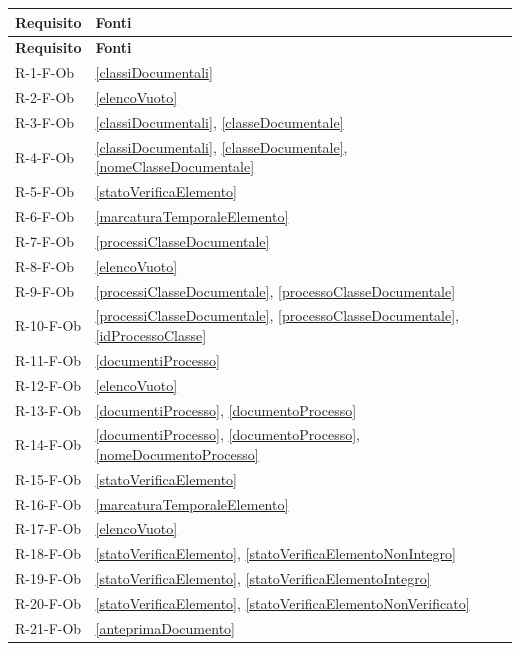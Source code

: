 \setlength{\LTleft}{\fill}
\setlength{\LTright}{\fill}
\begin{longtable}{|p{4cm}|p{10cm}|}
\hline
\rowcolor{zpusgreen!30}
\textbf{Requisito} & \textbf{Fonti} \\
\hline
\endfirsthead
\rowcolor{zpusgreen!30}
\textbf{Requisito} & \textbf{Fonti} \\
\hline
\endhead
R-1-F-Ob & \ref{classiDocumentali} \\
\hline
R-2-F-Ob & \ref{elencoVuoto} \\
\hline
R-3-F-Ob & \ref{classiDocumentali}, \ref{classeDocumentale} \\
\hline
R-4-F-Ob & \ref{classiDocumentali}, \ref{classeDocumentale}, \ref{nomeClasseDocumentale} \\
\hline
R-5-F-Ob & \ref{statoVerificaElemento} \\
\hline
R-6-F-Ob & \ref{marcaturaTemporaleElemento} \\
\hline
R-7-F-Ob & \ref{processiClasseDocumentale} \\
\hline
R-8-F-Ob & \ref{elencoVuoto} \\
\hline
R-9-F-Ob & \ref{processiClasseDocumentale}, \ref{processoClasseDocumentale} \\
\hline
R-10-F-Ob & \ref{processiClasseDocumentale}, \ref{processoClasseDocumentale}, \ref{idProcessoClasse} \\
\hline
R-11-F-Ob & \ref{documentiProcesso} \\
\hline
R-12-F-Ob & \ref{elencoVuoto} \\
\hline
R-13-F-Ob & \ref{documentiProcesso}, \ref{documentoProcesso} \\
\hline
R-14-F-Ob & \ref{documentiProcesso}, \ref{documentoProcesso}, \ref{nomeDocumentoProcesso} \\
\hline
R-15-F-Ob & \ref{statoVerificaElemento} \\
\hline
R-16-F-Ob & \ref{marcaturaTemporaleElemento} \\
\hline
R-17-F-Ob & \ref{elencoVuoto} \\
\hline
R-18-F-Ob & \ref{statoVerificaElemento}, \ref{statoVerificaElementoNonIntegro} \\
\hline
R-19-F-Ob & \ref{statoVerificaElemento}, \ref{statoVerificaElementoIntegro} \\
\hline
R-20-F-Ob & \ref{statoVerificaElemento}, \ref{statoVerificaElementoNonVerificato} \\
\hline
R-21-F-Ob & \ref{anteprimaDocumento} \\

\end{longtable}
